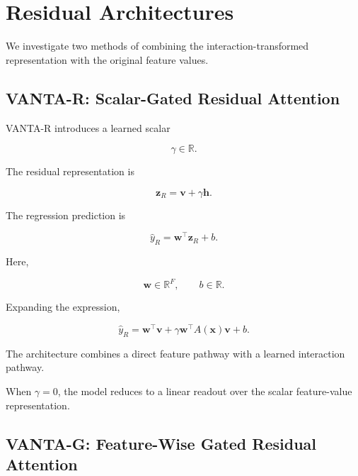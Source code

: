 \documentclass[11pt,a4paper]{article}
\newcommand{\R}{\mathbb{R}}
\begin{document}
\section{Residual Architectures}

We investigate two methods of combining
the interaction-transformed representation
with the original feature values.

\subsection{VANTA-R: Scalar-Gated Residual Attention}

VANTA-R introduces a learned scalar

\begin{equation}
\gamma\in\R.
\end{equation}

The residual representation is

\begin{equation}
\boxed{
\mathbf{z}_R
=
\mathbf{v}+\gamma\mathbf{h}.
}
\label{eq:residual_r}
\end{equation}

The regression prediction is

\begin{equation}
\boxed{
\hat y_R
=
\mathbf{w}^{\top}\mathbf{z}_R+b.
}
\label{eq:prediction_r}
\end{equation}

Here,

\begin{equation}
\mathbf{w}\in\R^F,
\qquad b\in\R.
\end{equation}

Expanding the expression,

\begin{equation}
\hat y_R
=
\mathbf{w}^{\top}\mathbf{v}
+
\gamma\mathbf{w}^{\top}
A(\mathbf{x})\mathbf{v}
+b.
\end{equation}

The architecture combines a direct
feature pathway with a learned
interaction pathway.

When $\gamma=0$, the model reduces
to a linear readout over the scalar
feature-value representation.

\subsection{VANTA-G: Feature-Wise Gated Residual Attention}
\end{document}
